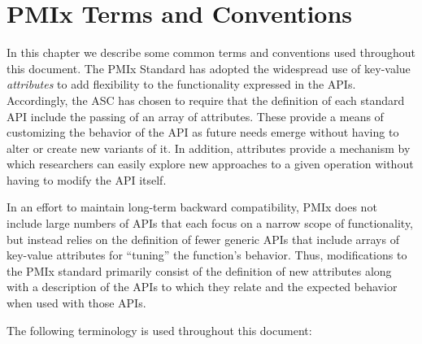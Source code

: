 \chapter{PMIx Terms and Conventions}
\label{chap:terms}

In this chapter we describe some common terms and conventions used throughout
this document. The \ac{PMIx} Standard has adopted the widespread use of
key-value \textit{attributes} to add flexibility to the functionality expressed
in the \acp{API}. Accordingly, the \ac{ASC} has chosen to require that
the definition of each standard \ac{API} include the passing of an array of
attributes. These provide a means of customizing the behavior of the \ac{API}
as future needs emerge without having to alter or create new variants of it. In
addition, attributes provide a mechanism by which researchers can easily
explore new approaches to a given operation without having to modify the
\ac{API} itself.

In an effort to maintain long-term backward compatibility, \ac{PMIx} does not include large numbers of \acp{API} that each focus on a narrow scope of functionality, but instead relies on the definition of fewer generic \acp{API} that include arrays of key-value attributes for ``tuning'' the function's behavior. Thus, modifications to the \ac{PMIx} standard primarily consist of the definition of new attributes along with a description of the \acp{API} to which they relate and the expected behavior when used with those \acp{API}.

The following terminology is used throughout this document:

